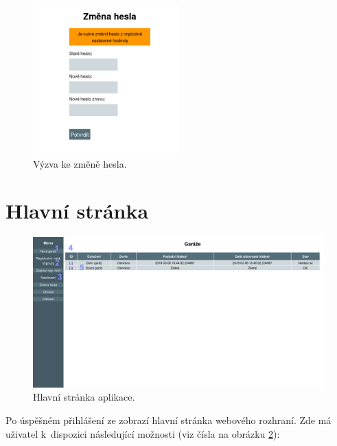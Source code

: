 \begin{figure}[h!]
    \centering
    \includegraphics[width=0.5\textwidth]{images/pwd_change.png}
    \caption[Výzva ke změně hesla]{Výzva ke změně hesla.}
    \label{fig:password_change}
\end{figure}

\newpage

\section{Hlavní stránka}

\begin{figure}[h!]
    \centering
    \includegraphics[width=\textwidth]{images/mainpage.png}
    \caption[Hlavní stránka aplikace]{Hlavní stránka aplikace.}
    \label{fig:mainpage}
\end{figure}

Po úspěšném přihlášení ze zobrazí hlavní stránka webového rozhraní. Zde má uživatel k~dispozici následující možnosti (viz čísla na obrázku \ref{fig:mainpage}):

